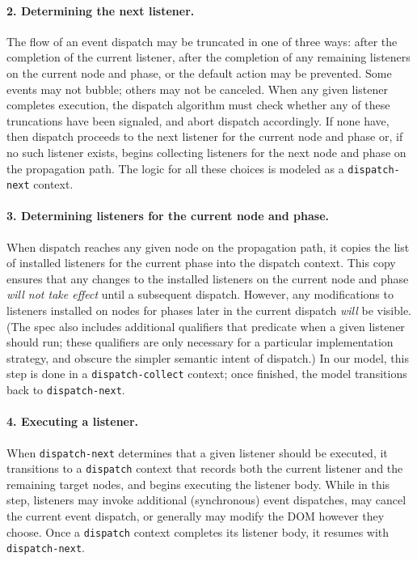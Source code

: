 \documentclass[letterpaper,10pt,twocolumn]{article}
\newcommand{\quot}{\mbox{\tt\char'042}}
\newcommand{\wild}{\mbox{\tt\char'137}}
\newcommand{\impl}[1]{{\def\_{\wild}\def\"{\quot}\tt#1}}
\begin{document}
\paragraph{2. Determining the next listener.}  The flow of an event
dispatch may be truncated in one of three ways: after the completion
of the current listener, after the completion of any remaining
listeners on the current node and phase, or the default action may be
prevented.  Some events may not bubble; others may not be canceled.
When any given listener completes execution, the dispatch algorithm
must check whether any of these truncations have been signaled, and
abort dispatch accordingly.  If none have, then dispatch proceeds to
the next listener for the current node and phase or, if no such
listener exists, begins collecting listeners for the next node and
phase on the propagation path.  The logic for all these choices is
modeled as a \impl{dispatch-next} context.

\paragraph{3. Determining listeners for the current node and phase.}
When dispatch reaches any given node on the propagation path, it
copies the list of installed listeners for the current phase into the
dispatch context.  This copy ensures that any changes to the installed
listeners on the current node and phase \emph{will not take effect}
until a subsequent dispatch.  However, any modifications to listeners
installed on nodes for phases later in the current dispatch
\emph{will} be visible.  (The spec also includes additional qualifiers
that predicate when a given listener should run; these qualifiers are
only necessary for a particular implementation strategy, and obscure
the simpler semantic intent of dispatch.)  In our model, this step is
done in a \impl{dispatch-collect} context; once finished, the model
transitions back to \impl{dispatch-next}.

\paragraph{4. Executing a listener.}  When \impl{dispatch-next}
determines that a given listener should be executed, it transitions to
a \impl{dispatch} context that records both the current listener and
the remaining target nodes, and begins executing the listener body.
While in this step, listeners may invoke additional (synchronous)
event dispatches, may cancel the current event dispatch, or generally
may modify the DOM however they choose.  Once a \impl{dispatch}
context completes its listener body, it resumes with \impl{dispatch-next}.
\end{document}
